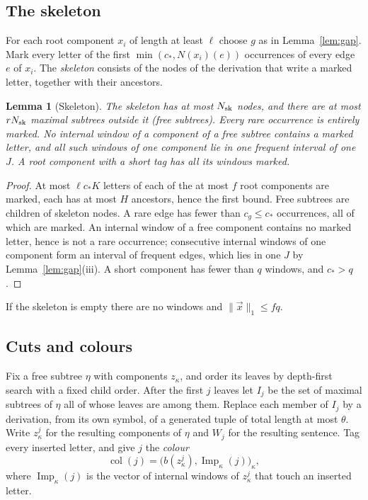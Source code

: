 \documentclass[11pt]{article}
\numberwithin{equation}{section}
\theoremstyle{plain}
\newtheorem{lemma}[theorem]{Lemma}
\theoremstyle{definition}
\theoremstyle{remark}
\theoremstyle{plain}
\newcommand{\tuple}[1]{\vec{#1}}
\newcommand{\Imp}{\operatorname{Imp}}
\begin{document}
\subsection{The skeleton}

For each root component $x_i$ of length at least $\ell$ choose $g$ as in
Lemma~\ref{lem:gap}.  Mark every letter of the first $\min(c_*,N(x_i)(e))$
occurrences of every edge $e$ of $x_i$.  The \emph{skeleton} consists of the
nodes of the derivation that write a marked letter, together with their
ancestors.

\begin{lemma}[Skeleton]
\label{lem:skeleton}
The skeleton has at most $N_{\rm sk}$ nodes, and there are at most $rN_{\rm sk}$
maximal subtrees outside it (\emph{free subtrees}).  Every rare occurrence is
entirely marked.  No internal window of a component of a free subtree contains a
marked letter, and all such windows of one component lie in one frequent
interval of one $J$.  A root component with a short tag has all its windows
marked.
\end{lemma}

\begin{proof}
At most $\ell c_*K$ letters of each of the at most $f$ root components are
marked, each has at most $H$ ancestors, hence the first bound.  Free subtrees are
children of skeleton nodes.  A rare edge has fewer than $c_g\le c_*$
occurrences, all of which are marked.  An internal window of a free component
contains no marked letter, hence is not a rare occurrence; consecutive internal
windows of one component form an interval of frequent edges, which lies in one
$J$ by Lemma~\ref{lem:gap}(iii).  A short component has fewer than $q$ windows,
and $c_*>q$.
\end{proof}

If the skeleton is empty there are no windows and $\|\tuple x\|_1\le fq$.

\subsection{Cuts and colours}

Fix a free subtree $\eta$ with components $z_\kappa$, and order its leaves by
depth-first search with a fixed child order.  After the first $j$ leaves let
$I_j$ be the set of maximal subtrees of $\eta$ all of whose leaves are among
them.  Replace each member of $I_j$ by a derivation, from its own symbol, of a
generated tuple of total length at most $\theta$.  Write $z^j_\kappa$ for the
resulting components of $\eta$ and $W_j$ for the resulting sentence.  Tag every
inserted letter, and give $j$ the \emph{colour}
\[
  \operatorname{col}(j)=\bigl(b(z^j_\kappa),\Imp_\kappa(j)\bigr)_\kappa,
\]
where $\Imp_\kappa(j)$ is the vector of internal windows of $z^j_\kappa$ that
touch an inserted letter.
\end{document}
